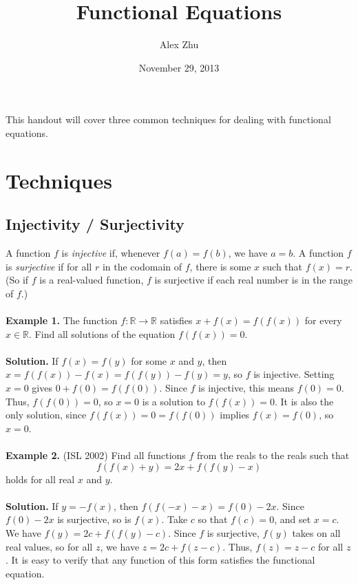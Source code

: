 \documentclass[11pt]{article}
\begin{document}
 

\title{Functional Equations}
\author{Alex Zhu}
\date{November 29, 2013}

\maketitle

This handout will cover three common techniques for dealing with functional equations. 

\section{Techniques}

\subsection{Injectivity / Surjectivity}

A function $f$ is \emph{injective} if, whenever $f(a) = f(b)$, we have $a = b$. A function $f$ is \emph{surjective} if for all $r$ in the codomain of $f$, there is some $x$ such that $f(x) = r$. (So if $f$ is a real-valued function, $f$ is surjective if each real number is in the range of $f$.) 
\\\\
\textbf{Example 1.} The function $f : \mathbb{R} \to \mathbb{R}$ satisfies $x + f(x) = f(f(x))$ for every $x \in \mathbb{R}$. Find all solutions of the equation $f(f(x)) = 0$. 
\\\\
\textbf{Solution.} If $f(x) = f(y)$ for some $x$ and $y$, then $x = f(f(x)) - f(x) = f(f(y)) - f(y) = y$, so $f$ is injective. Setting $x = 0$ gives $0 + f(0) = f(f(0))$. Since $f$ is injective, this means $f(0) = 0$. Thus, $f(f(0)) = 0$, so $x = 0$ is a solution to $f(f(x)) = 0$. It is also the only solution, since $f(f(x)) = 0 = f(f(0))$ implies $f(x) = f(0)$, so $x = 0$.
\\\\
\textbf{Example 2.} (ISL 2002) Find all functions $f$ from the reals to the reals such that 
  \[ f(f(x) + y) = 2x + f(f(y) - x) \]
  holds for all real $x$ and $y$.
\\\\
\textbf{Solution.} If $y = -f(x)$, then $f(f(-x) - x) = f(0) - 2x$. Since $f(0) - 2x$ is surjective, so is $f(x)$. Take $c$ so that $f(c) = 0$, and set $x = c$. We have $f(y) = 2c + f(f(y) - c)$. Since $f$ is surjective, $f(y)$ takes on all real values, so for all $z$, we have $z = 2c + f(z - c)$. Thus, $f(z) = z - c$ for all $z$. It is easy to verify that any function of this form satisfies the functional equation. 
\end{document}
